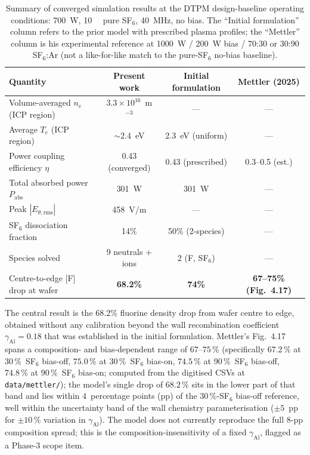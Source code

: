 \documentclass[11pt,a4paper]{report}
\newcommand{\Te}{T_e}
\begin{document}
\begin{table}[H]
\centering
\caption{Summary of converged simulation results at the DTPM design-baseline operating conditions: \SI{700}{\watt}, \SI{10}{\milli\torr} pure SF$_6$, \SI{40}{\mega\hertz}, no bias.  The ``Initial formulation'' column refers to the prior model with prescribed plasma profiles; the ``Mettler'' column is his experimental reference at \SI{1000}{\watt} / \SI{200}{\watt} bias / 70:30 or 30:90 SF$_6$:Ar (not a like-for-like match to the pure-SF$_6$ no-bias baseline).}
\label{tab:results-summary}
\begin{tabular}{lccc}
\toprule
\textbf{Quantity} & \textbf{Present work} & \textbf{Initial formulation} & \textbf{Mettler (2025)} \\
\midrule
Volume-averaged $n_e$ (ICP region)    & $3.3 \times 10^{16}$~m$^{-3}$ & --- & --- \\
Average $\Te$ (ICP region)            & $\sim 2.4$~eV        & 2.3~eV (uniform)      & --- \\
Power coupling efficiency $\eta$     & 0.43 (converged)    & 0.43 (prescribed)     & 0.3--0.5 (est.) \\
Total absorbed power $P_\mathrm{abs}$     & \SI{301}{\watt}     & \SI{301}{\watt}       & --- \\
Peak $|E_{\theta,\mathrm{rms}}|$ & \SI{458}{\volt/\meter} & --- & --- \\
SF$_6$ dissociation fraction          & 14\%                 & 50\% (2-species)      & --- \\
Species solved                        & 9 neutrals + ions    & 2 (F, SF$_6$)         & --- \\
Centre-to-edge [F] drop at wafer     & \textbf{68.2\%}     & \textbf{74\%}         & \textbf{67--75\% (Fig.~4.17)} \\
\bottomrule
\end{tabular}
\end{table}

The central result is the 68.2\% fluorine density drop from wafer centre to edge, obtained without any calibration beyond the wall recombination coefficient $\gamma_\mathrm{Al} = 0.18$ that was established in the initial formulation.  Mettler's Fig.~4.17 spans a composition- and bias-dependent range of $67$--$75\,\%$ (specifically $67.2\,\%$ at 30\,\%~SF$_6$ bias-off, $75.0\,\%$ at 30\,\%~SF$_6$ bias-on, $74.5\,\%$ at 90\,\%~SF$_6$ bias-off, $74.8\,\%$ at 90\,\%~SF$_6$ bias-on; computed from the digitised CSVs at \texttt{data/mettler/}); the model's single drop of $68.2\,\%$ sits in the lower part of that band and lies within $4$~percentage points (pp) of the 30\,\%-SF$_6$ bias-off reference, well within the uncertainty band of the wall chemistry parameterisation ($\pm 5$~pp for $\pm 10\,\%$ variation in $\gamma_\mathrm{Al}$).  The model does not currently reproduce the full $8$-pp composition spread; this is the composition-insensitivity of a fixed $\gamma_\mathrm{Al}$, flagged as a Phase-3 scope item.
\end{document}

